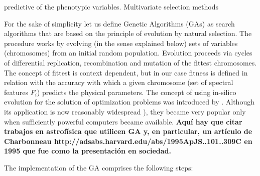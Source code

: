 {{%
predictive of the phenotypic variables. Multivariate selection methods

For the sake of simplicity let us define Genetic Algorithms (GAs) as
search algorithms that are based on the principle of evolution by
natural selection. The procedure works by evolving (in the sense
explained below) sets of variables (chromosomes) from an initial
random population. Evolution proceeds via cycles of differential
replication, recombination and mutation of the fittest
chromosomes. The concept of fittest is context dependent, but in our
case fitness is defined in relation with the accuracy with which a
given chromosome (set of spectral features ${F_i}$) predicts the
physical parameters. The concept of using in-silico evolution for the
solution of optimization problems was introduced
by \cite{holland1975adaptation}. Although its application is now
reasonably widespread \citep[see e.g. ]{goldberg1989genetic}), they
became very popular only when sufficiently powerful computers became
available. {\bf Aquí hay que citar trabajos en astrofísica que
utilicen GA y, en particular, un artículo de Charbonneau
http://adsabs.harvard.edu/abs/1995ApJS..101..309C en 1995 que fue como
la presentación en sociedad.}

The implementation of the GA comprises the following steps:

}}
